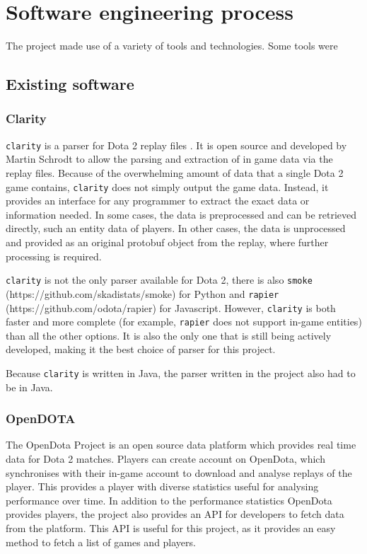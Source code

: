 \documentclass[Report.tex]{subfiles}
\begin{document}
\section{Software engineering process}
The project made use of a variety of tools and technologies. Some tools were 

\subsection{Existing software}

\subsubsection{Clarity}
\texttt{clarity} is a parser for Dota 2 replay files \cite{clarity}. It is open source and developed by Martin Schrodt to allow the parsing and extraction of in game data via  the replay files. Because of the overwhelming amount of data that a single Dota 2 game contains, \texttt{clarity} does not simply output the game data. Instead, it provides an interface for any programmer to extract the exact data or information needed. In some cases, the data is preprocessed and can be retrieved directly, such an entity data of players. In other cases, the data is unprocessed and provided as an original protobuf object from the replay, where further processing is required. 

\texttt{clarity} is not the only parser available for Dota 2, there is also \texttt{smoke} (https://github.com/skadistats/smoke) for Python and \texttt{rapier} (https://github.com/odota/rapier) for Javascript. However, \texttt{clarity} is both faster and more complete (for example, \texttt{rapier} does not support in-game entities) than all the other options. It is also the only one that is still being actively developed, making it the best choice of parser for this project. 

Because \texttt{clarity} is written in Java, the parser written in the project also had to be in Java. 


\subsubsection{OpenDOTA}
The OpenDota Project \cite{opendota} is an open source data platform which provides real time data for Dota 2 matches. Players can create account on OpenDota, which synchronises with their in-game account to download and analyse replays of the player. This provides a player with diverse statistics useful for analysing performance over time. In addition to the performance statistics OpenDota provides players, the project also provides an API for developers to fetch data from the platform. This API is useful for this project, as it provides an easy method to fetch a list of games and players.
\end{document}
